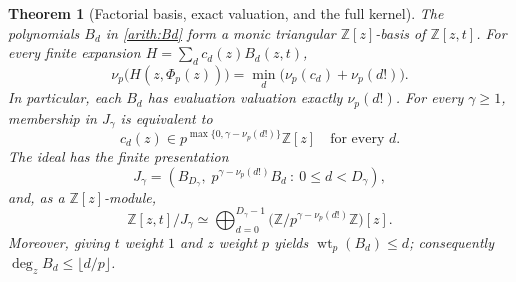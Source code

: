 \documentclass[11pt,a4paper]{article}
\newtheorem{theorem}{Theorem}
\theoremstyle{definition}
\theoremstyle{remark}\newtheorem{remark}[lemma]{Remark}
\begin{document}
\begin{theorem}[Factorial basis, exact valuation, and the full kernel]
\label{arith:factorialbasis}
The polynomials $B_d$ in \eqref{arith:Bd} form a monic triangular
$\mathbb Z[z]$-basis of $\mathbb Z[z,t]$. For every finite expansion
$H=\sum_dc_d(z)B_d(z,t)$,
\begin{equation}\label{arith:exactnorm}
 \nu_p\bigl(H(z,\Phi_p(z))\bigr)
   =\min_d\bigl(\nu_p(c_d)+\nu_p(d!)\bigr).
\end{equation}
In particular, each $B_d$ has evaluation valuation exactly $\nu_p(d!)$.
For every $\gamma\geq1$, membership in $J_\gamma$ is equivalent to
\begin{equation}\label{arith:kernelcriterion}
 c_d(z)\in p^{\max\{0,\gamma-\nu_p(d!)\}}\mathbb Z[z]
 \quad\text{for every }d.
\end{equation}
The ideal has the finite presentation
\begin{equation}\label{arith:kernelideal}
 J_\gamma=
 \left(B_{D_\gamma},\;
 p^{\gamma-\nu_p(d!)}B_d\ :\ 0\leq d<D_\gamma\right),
\end{equation}
and, as a $\mathbb Z[z]$-module,
\begin{equation}\label{arith:module}
 \mathbb Z[z,t]/J_\gamma
 \simeq\bigoplus_{d=0}^{D_\gamma-1}
       \bigl(\mathbb Z/p^{\gamma-\nu_p(d!)}\mathbb Z\bigr)[z].
\end{equation}
Moreover, giving $t$ weight $1$ and $z$ weight $p$ yields
$\operatorname{wt}_p(B_d)\leq d$; consequently
$\deg_z B_d\leq\lfloor d/p\rfloor$.
\end{theorem}
\end{document}
